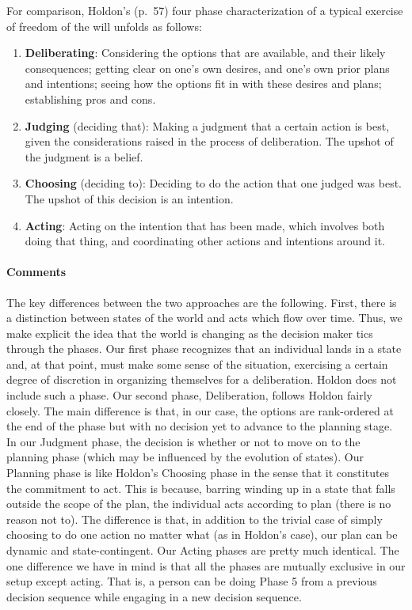 \documentclass[
11pt,
titlepage,
reqno,
]{article}%
\theoremstyle{definition}
\begin{document}
For comparison, Holdon's (p.\ 57) four phase characterization of a typical exercise of freedom of the will unfolds as follows: 
\begin{enumerate}
	\item \textbf{Deliberating}: Considering the options that are available, and their likely consequences; getting clear on one’s own desires, and one’s own prior plans and intentions; seeing how the options ﬁt in with these desires and plans; establishing pros and cons. 
	\item \textbf{Judging} (deciding that): Making a judgment that a certain action is best, given the considerations raised in the process of deliberation. 
	The upshot of the judgment is a belief. 
	\item \textbf{Choosing} (deciding to): Deciding to do the action that one judged was best. 
	The upshot of this decision is an intention. 
	\item \textbf{Acting}: Acting on the intention that has been made, which involves both doing that thing, and coordinating other actions and intentions around it.
\end{enumerate}

\paragraph{Comments} The key differences between the two approaches are the following. 
First, there is a distinction between states of the world and acts which flow over time. 
Thus, we make explicit the idea that the world is changing as the decision maker tics through the phases. 
Our first phase recognizes that an individual lands in a state and, at that point, must make some sense of the situation, exercising a certain degree of discretion in  organizing themselves for a deliberation. Holdon does not include such a phase. 
Our second phase, Deliberation, follows Holdon fairly closely. 
The main difference is that, in our case, the options are rank-ordered at the end of the phase but with no decision yet to advance to the planning stage. 
In our Judgment phase, the decision is whether or not to move on to the planning phase (which may be influenced by the evolution of states). 
Our Planning phase is like Holdon's Choosing phase in the sense that it constitutes the commitment to act. 
This is because, barring winding up in a state that falls outside the scope of the plan, the individual acts according to plan (there is no reason not to). 
The difference is that, in addition to the trivial case of simply choosing to do one action no matter what (as in Holdon's case), our plan can be dynamic and state-contingent. 
Our Acting phases are pretty much identical. The one difference we have in mind is that all the phases are mutually exclusive in our setup except acting. 
That is, a person can be doing Phase 5 from a previous decision sequence while engaging in a new decision sequence.  
\end{document}
